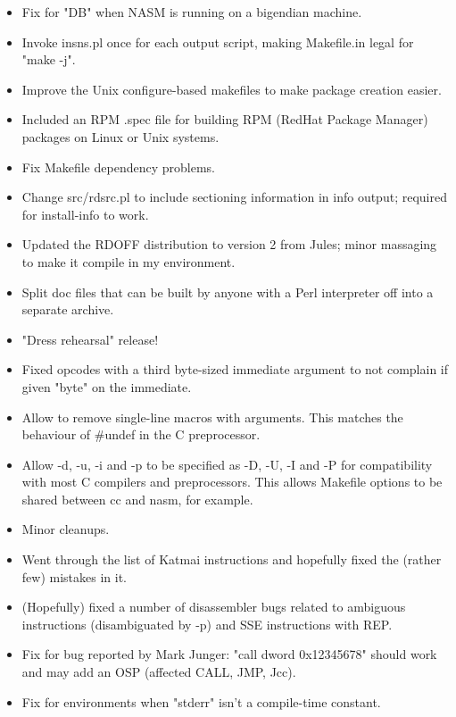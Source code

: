 
\begin{itemize}
    \item{Fix for "DB" when NASM is running on a bigendian machine.}
    \item{Invoke insns.pl once for each output script, making Makefile.in
        legal for "make -j".}
    \item{Improve the Unix configure-based makefiles to make package
        creation easier.}
    \item{Included an RPM .spec file for building RPM (RedHat Package Manager)
        packages on Linux or Unix systems.}
    \item{Fix Makefile dependency problems.}
    \item{Change src/rdsrc.pl to include sectioning information in info
        output; required for install-info to work.}
    \item{Updated the RDOFF distribution to version 2 from Jules; minor
        massaging to make it compile in my environment.}
    \item{Split doc files that can be built by anyone with a Perl interpreter off
        into a separate archive.}
    \item{"Dress rehearsal" release!}
\end{itemize}


\begin{itemize}
    \item{Fixed opcodes with a third byte-sized immediate argument to not
        complain if given "byte" on the immediate.}
    \item{Allow  to remove single-line macros with arguments. This
        matches the behaviour of \#undef in the C preprocessor.}
    \item{Allow -d, -u, -i and -p to be specified as -D, -U, -I and -P for
        compatibility with most C compilers and preprocessors. This allows
        Makefile options to be shared between cc and nasm, for example.}
    \item{Minor cleanups.}
    \item{Went through the list of Katmai instructions and hopefully fixed the
        (rather few) mistakes in it.}
    \item{(Hopefully) fixed a number of disassembler bugs related to ambiguous
        instructions (disambiguated by -p) and SSE instructions with REP.}
    \item{Fix for bug reported by Mark Junger: "call dword 0x12345678" should
        work and may add an OSP (affected CALL, JMP, Jcc).}
    \item{Fix for environments when "stderr" isn't a compile-time constant.}
\end{itemize}

